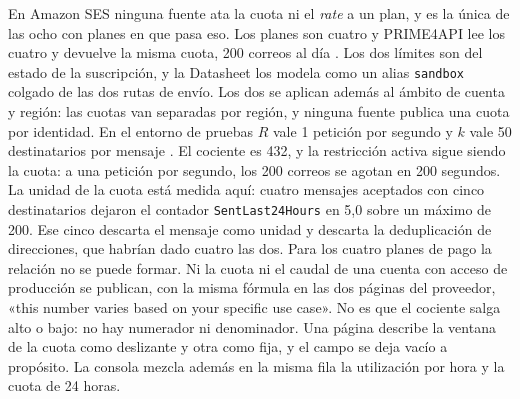 En Amazon SES ninguna fuente ata la cuota ni el \textit{rate} a un plan, y es la única de las ocho con planes en que pasa eso.
Los planes son cuatro y PRIME4API lee los cuatro y devuelve la misma cuota, 200 correos al día \citep{sespricing}.
Los dos límites son del estado de la suscripción, y la Datasheet los modela como un alias \texttt{sandbox} colgado de las dos rutas de envío.
Los dos se aplican además al ámbito de cuenta y región: las cuotas van separadas por región, y ninguna fuente publica una cuota por identidad.
En el entorno de pruebas $R$ vale 1 petición por segundo y $k$ vale 50 destinatarios por mensaje \citep{sesdocs}.
El cociente es 432, y la restricción activa sigue siendo la cuota: a una petición por segundo, los 200 correos se agotan en 200 segundos.
La unidad de la cuota está medida aquí: cuatro mensajes aceptados con cinco destinatarios dejaron el contador \texttt{SentLast24Hours} en 5,0 sobre un máximo de 200.
Ese cinco descarta el mensaje como unidad y descarta la deduplicación de direcciones, que habrían dado cuatro las dos.
Para los cuatro planes de pago la relación no se puede formar.
Ni la cuota ni el caudal de una cuenta con acceso de producción se publican, con la misma fórmula en las dos páginas del proveedor, «this number varies based on your specific use case».
No es que el cociente salga alto o bajo: no hay numerador ni denominador.
Una página describe la ventana de la cuota como deslizante y otra como fija, y el campo se deja vacío a propósito. La consola mezcla además en la misma fila la utilización por hora y la cuota de 24 horas.

